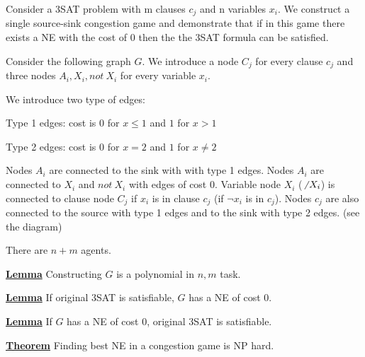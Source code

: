 Consider a 3SAT problem with m clauses $c_j$ and n variables $x_i$. We construct a single source-sink congestion game and demonstrate that if in this game there exists a NE with the cost of 0 then the the 3SAT formula can be satisfied.

Consider the following graph $G$. We introduce a node $C_j$ for every clause $c_j$ and three nodes $A_i,X_i,not\ X_i$ for every variable $x_i$.

We introduce two type of edges:

Type 1 edges: cost is 0 for $x\leq1$ and $1$ for $x>1$

Type 2 edges: cost is 0 for $x=2$ and $1$ for $x\neq 2$

Nodes $A_i$ are connected to the sink with with type 1 edges. Nodes $A_i$ are connected to $X_i$ and $not\ X_i$ with edges of cost 0. Variable node $X_i$ ($\not\ X_i$) is connected to clause node $C_j$ if $x_i$ is in clause $c_j$ (if $\neg x_i$ is in $c_j$). Nodes $c_j$ are also connected to the source with type 1 edges and to the sink with type 2 edges. (see the diagram)

There are $n+m$ agents.

\uline{\textbf{Lemma}} Constructing $G$ is a polynomial in $n,m$ task.

\uline{\textbf{Lemma}} If original 3SAT is satisfiable, $G$ has a NE of cost 0.

\uline{\textbf{Lemma}} If  $G$ has a NE of cost 0, original 3SAT is satisfiable.

\uline{\textbf{Theorem}} Finding best NE in a congestion game is NP hard.

